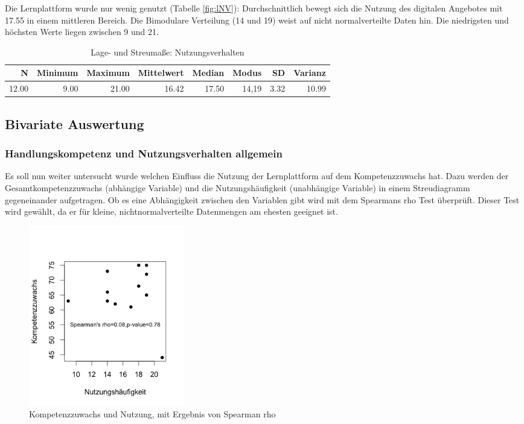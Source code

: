 \documentclass[12pt, bibliography=totoc]{scrartcl}
\begin{document}
Die Lernplattform wurde nur wenig genutzt (Tabelle \ref{fig:lNV}):
Durchschnittlich bewegt sich die Nutzung des digitalen Angebotes mit
17.55 in einem mittleren Bereich. Die Bimodulare Verteilung (14 und 19)
weist auf nicht normalverteilte Daten hin. Die niedrigsten und höchsten
Werte liegen zwischen 9 und 21.

\begin{table}[H]
\centering
\caption{Lage- und Streumaße: Nutzungsverhalten}
\label{tab:NV}
\begin{tabular}{rrrrrrrr}
  \hline
  N & Minimum & Maximum & Mittelwert & Median & Modus & SD & Varianz \\
  \hline
 12.00 & 9.00 & 21.00 & 16.42 & 17.50 & 14,19 & 3.32 & 10.99 \\     
   \hline
\end{tabular}
\end{table}

\subsection{Bivariate Auswertung}\label{bivariate-auswertung}

\subsubsection{Handlungskompetenz und Nutzungsverhalten
allgemein}\label{handlungskompetenz-und-nutzungsverhalten-allgemein}

Es soll nun weiter untersucht wurde welchen Einfluss die Nutzung der
Lernplattform auf dem Kompetenzzuwachs hat. Dazu werden der
Gesamtkompetenzzuwachs (abhängige Variable) und die Nutzungshäufigkeit
(unabhängige Variable) in einem Streudiagramm gegeneinander aufgetragen.
Ob es eine Abhängigkeit zwischen den Variablen gibt wird mit dem
Spearmans rho Test überprüft. Dieser Test wird gewählt, da er für
kleine, nichtnormalverteilte Datenmengen am ehesten geeignet ist.

\begin{figure}[H]
\centering
\includegraphics[width=0.33\textwidth]{Anhang/Spearman.png}
\caption{Kompetenzzuwachs und Nutzung, mit Ergebnis von Spearman rho}
\label{fig:spear}
\end{figure}
\end{document}
